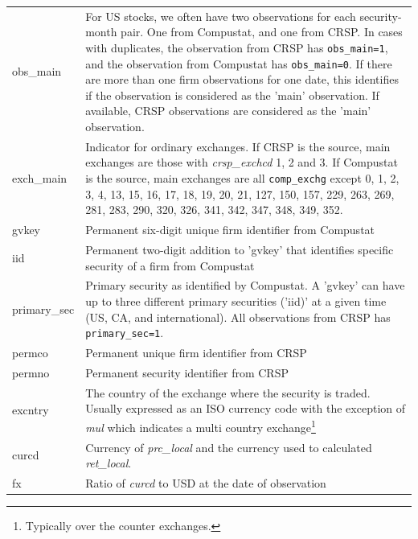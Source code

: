 \documentclass[12pt,title,fleqn]{article}
\begin{document}
{\begin{longtable}{@{\extracolsep{\fill}}|l|m{14.2cm}|@{}}
		obs\_main & For US stocks, we often have two observations for each security-month pair. One from Compustat, and one from CRSP. In cases with duplicates, the observation from CRSP has \texttt{obs\_main=1}, and the observation from Compustat has \texttt{obs\_main=0}.  
		If there are more than one firm observations for one date, this identifies if the observation is considered as the 'main' observation. If available, CRSP observations are considered as the 'main' observation.\\[1ex]
		
		exch\_main & Indicator for ordinary exchanges. If CRSP is the source, main exchanges are those with \textit{crsp\_exchcd} 1, 2 and 3. If Compustat is the source, main exchanges are all \texttt{comp\_exchg} except 0, 1, 2, 3, 4, 13, 15, 16, 17, 18, 19, 20, 21, 127, 150, 157, 229, 263, 269, 281, 283, 290, 320, 326, 341, 342, 347, 348, 349, 352.  \\[1ex]
		
		gvkey & Permanent six-digit unique firm identifier from Compustat\\[1ex]
		
		iid & Permanent two-digit addition to 'gvkey' that identifies specific security of a firm from Compustat\\[1ex]
		
		primary\_sec &  Primary security as identified by Compustat. A 'gvkey' can have up to three different primary securities ('iid)' at a given time (US, CA, and international). All observations from CRSP has \texttt{primary\_sec=1}.  \\[1ex]
		
		permco & Permanent unique firm identifier from CRSP\\[1ex]
		
		permno & Permanent security identifier from CRSP\\[1ex]
		
		excntry & The country of the exchange where the security is traded. Usually expressed as an ISO currency code with the exception of \textit{mul} which indicates a multi country exchange\footnote{Typically over the counter exchanges.}\\[1ex]
		
		curcd & Currency of \textit{prc\_local} and the currency used to calculated \textit{ret\_local}. \\[1ex]
		
		fx & Ratio of \textit{curcd} to USD at the date of observation\\[1ex]
		

\end{longtable}}
\end{document}

